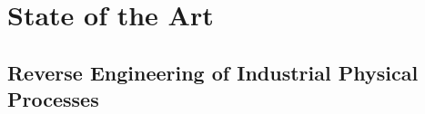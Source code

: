 \chapter{State of the Art}
\label{state_of_art}

\section{Reverse Engineering of Industrial Physical Processes}
\label{sec:reunivr}